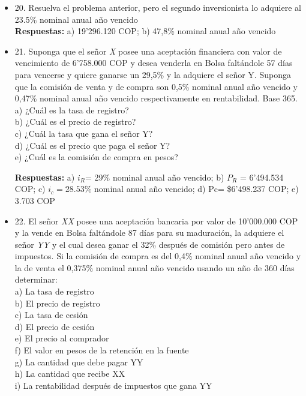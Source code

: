 \begin{itemize}
       \textbf{Respuestas:} a) 7'598.455 COP; b) 17,14\% nominal anual año vencido\\
       \medskip

 \item 20. Resuelva el problema anterior, pero el segundo inversionista lo adquiere al 23.5\% nominal anual año vencido\\
       \textbf{Respuestas:} a) 19'296.120 COP; b) 47,8\% nominal anual año vencido\\
       \medskip

 \item 21. Suponga que el señor \textit{X} posee una aceptación financiera con valor de vencimiento de 6'758.000 COP y desea venderla en Bolsa faltándole 57 días para vencerse y quiere ganarse un 29,5\% y la adquiere el señor Y. Suponga que la comisión de venta y de compra son 0,5\% nominal anual año vencido  y 0,47\% nominal anual año vencido respectivamente en rentabilidad. Base 365.\\
       a) ¿Cuál es la tasa de registro?\\
       b) ¿Cuál es el precio de registro?\\
       c) ¿Cuál la tasa que gana el señor Y?\\
       d) ¿Cuál es el precio que paga el señor Y?\\
       e) ¿Cuál es la comisión de compra en pesos?
       
       \textbf{Respuestas:} a) $i_{R}$= 29\% nominal anual año vencido; b) $P_{R}$ = 6'494.534 COP; c) $i_{c} = 28.53\%$ nominal anual año vencido; d) Pc= \$6'498.237 COP; e) 3.703 COP\\
       \medskip

 \item 22. El señor \textit{XX} posee una aceptación bancaria por valor de 10’000.000 COP y la vende en Bolsa faltándole 87 días para su maduración, la adquiere el señor \textit{YY} y el cual desea ganar el 32\% después de comisión pero antes de impuestos. Si la comisión de compra es del 0,4\% nominal anual año vencido y la de venta el 0,375\% nominal anual año vencido usando un año de 360 días determinar:\\
       a)	La tasa de registro\\
       b)	El precio de registro\\
       c)	La tasa de cesión\\
       d)	El precio de cesión\\
       e)	El precio al comprador\\
       f)	El valor en pesos de la retención en la fuente\\
       g)	La cantidad que debe pagar YY\\
       h)	La cantidad que recibe XX\\
       i)	La rentabilidad después de impuestos que gana YY
       

\end{itemize}
